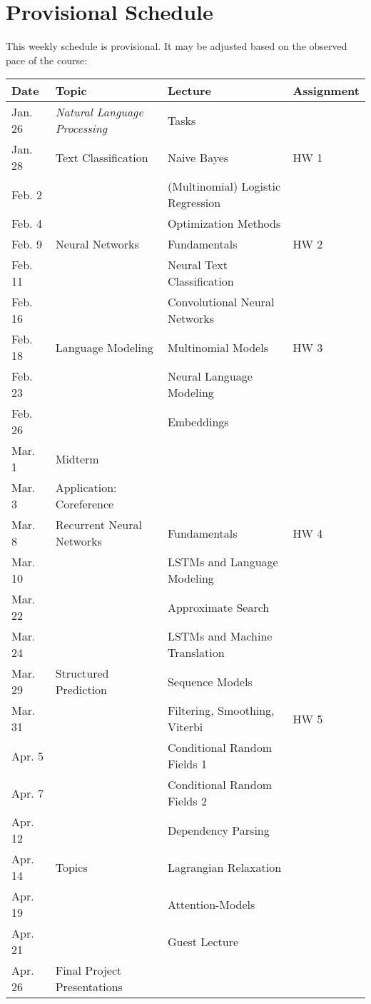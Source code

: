\documentclass[11pt]{article}
\begin{document}
\section{Provisional Schedule}

This weekly schedule is provisional. It may be adjusted based on the observed pace of the course:
\vspace {0.25cm}



 \begin{center}
\begin{tabular}{llll}
\toprule
Date &Topic &Lecture &Assignment \\
\midrule
Jan. 26 & \textit{Natural Language Processing}& Tasks & \\
Jan. 28 & Text Classification & Naive Bayes & HW 1 \\
Feb. 2  & & (Multinomial) Logistic Regression \\
Feb. 4  & & Optimization Methods \\
Feb. 9  & Neural Networks & Fundamentals & HW 2 \\
Feb. 11 & & Neural Text Classification & \\
Feb. 16 & & Convolutional Neural Networks &\\
Feb. 18 & Language Modeling & Multinomial Models & HW 3 \\
Feb. 23 & & Neural Language Modeling & \\
Feb. 26 & & Embeddings  & \\
Mar. 1 & Midterm  & \\
Mar. 3 & Application: Coreference \\
Mar. 8 & Recurrent Neural Networks & Fundamentals & HW 4 \\
Mar. 10 & & LSTMs and Language Modeling & \\
Mar. 22& & Approximate Search & \\
Mar. 24 & & LSTMs and Machine Translation & \\
Mar. 29 & Structured Prediction & Sequence Models &  \\
Mar. 31& & Filtering, Smoothing, Viterbi & HW 5 \\ 
Apr. 5 & & Conditional Random Fields 1 & \\
Apr. 7 & & Conditional Random Fields 2  \\
Apr. 12 & & Dependency Parsing \\
Apr. 14 & Topics & Lagrangian Relaxation  \\
Apr. 19 &  & Attention-Models \\
Apr. 21& & Guest Lecture \\
Apr. 26 & Final Project Presentations \\
\bottomrule
\end{tabular}
 \end{center}
\end{document}

